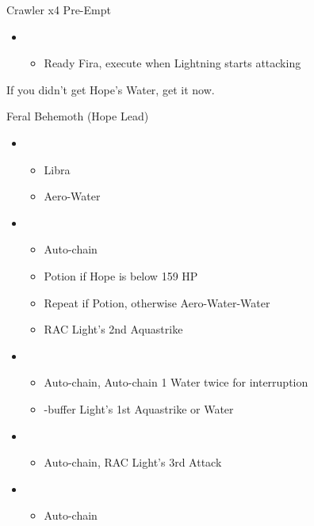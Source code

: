 	\begin{battle}[0:05]{Crawler x4 Pre-Empt}
		\begin{itemize}
			\item \first
			      \begin{itemize}
				      \item Ready Fira, execute when Lightning starts attacking
			      \end{itemize}
		\end{itemize}
	\end{battle}
	If you didn't get Hope's Water, get it now.
	\vfill
	\begin{battle}[0:40]{Feral Behemoth (Hope Lead)}
		\begin{itemize}
			\item \first
			      \begin{itemize}
				      \item Libra
				      \item Aero-Water
			      \end{itemize}
			\item \fourth
			      \begin{itemize}
				      \item Auto-chain
				      \item Potion if Hope is below 159 HP
				      \item Repeat if Potion, otherwise Aero-Water-Water
				      \item RAC Light's 2nd Aquastrike
			      \end{itemize}
			\item \fifth
			      \begin{itemize}
				      \item Auto-chain, Auto-chain 1 Water twice for interruption
				      \item \com-buffer Light's 1st Aquastrike or Water
			      \end{itemize}
			\item \sixth
			      \begin{itemize}
				      \item Auto-chain, RAC Light's 3rd Attack
			      \end{itemize}
			\item \first
				  \begin{itemize}
				      \item Auto-chain
				  \end{itemize}
		\end{itemize}
	\end{battle}

